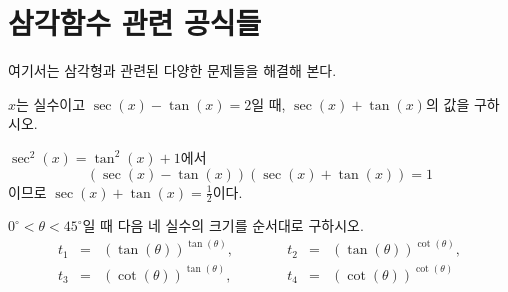 \documentclass[11pt, a4paper]{book}
\begin{document}
\section{삼각함수 관련 공식들}
여기서는 삼각형과 관련된 다양한 문제들을 해결해 본다.

\begin{example}
	$x$는 실수이고 $\sec(x)-\tan(x)=2$일 때, $\sec(x)+\tan(x)$의 값을 구하시오.
	\begin{solution}
		$\sec^{2}(x) = \tan^{2}(x)+1$에서 
		\[
		(\sec(x)-\tan(x))(\sec(x)+\tan(x)) =1
		\]
		이므로 $\sec(x) +\tan(x) =\frac{1}{2}$이다.
	\end{solution}
\end{example}

\begin{problem}
	$0^{\circ}<\theta < 45^{\circ}$일 때 다음 네 실수의 크기를 순서대로 구하시오.
 \[
 \begin{array}{cclccl}
 	t_{1} &=& (\tan(\theta))^{\tan(\theta)},\quad & \qquad t_{2}&=& (\tan(\theta))^{\cot(\theta)}, \\
 	t_{3} &=& (\cot(\theta))^{\tan(\theta)}, \quad & \qquad 	t_{4} &=& (\cot(\theta))^{\cot(\theta)} 
 \end{array}
 \]
\end{problem}
\end{document}

